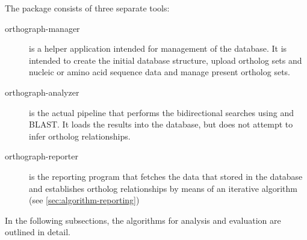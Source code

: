 \label{sec:algorithm}
The \pname package consists of three separate tools:

\begin{description}
	\item[orthograph-manager] is a helper application intended for management of
		the database. It is intended to create the initial database structure, upload
		ortholog sets and nucleic or amino acid sequence data and manage present
		ortholog sets.
	\item[orthograph-analyzer] is the actual pipeline that performs the
		bidirectional searches using  and BLAST. It loads the
		results into the database, but does not attempt to infer ortholog
		relationships. 
	\item[orthograph-reporter] is the reporting program that fetches the data that
		 stored in the database and establishes ortholog
		relationships by means of an iterative algorithm (see
		\autoref{sec:algorithm-reporting})
\end{description}

In the following subsections, the algorithms for analysis and evaluation are
outlined in detail.
